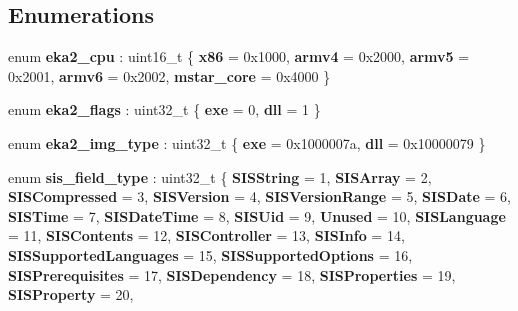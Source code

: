 \subsection*{Enumerations}
\begin{DoxyCompactItemize}
\item 
\mbox{\label{namespaceeka2l1_1_1loader_a2965b09ef67ddbbba27884b828b4d7de}} 
enum {\bfseries eka2\+\_\+cpu} \+: uint16\+\_\+t \{ \newline
{\bfseries x86} = 0x1000, 
{\bfseries armv4} = 0x2000, 
{\bfseries armv5} = 0x2001, 
{\bfseries armv6} = 0x2002, 
\newline
{\bfseries mstar\+\_\+core} = 0x4000
 \}
\item 
\mbox{\label{namespaceeka2l1_1_1loader_a7bbc600386d926fd237462ef426c4eff}} 
enum {\bfseries eka2\+\_\+flags} \+: uint32\+\_\+t \{ {\bfseries exe} = 0, 
{\bfseries dll} = 1
 \}
\item 
\mbox{\label{namespaceeka2l1_1_1loader_afeecb872ef5cc5f08b0a64828e4db532}} 
enum {\bfseries eka2\+\_\+img\+\_\+type} \+: uint32\+\_\+t \{ {\bfseries exe} = 0x1000007a, 
{\bfseries dll} = 0x10000079
 \}
\item 
\mbox{\label{namespaceeka2l1_1_1loader_a0810a682b50cd1c0f125ba1f1831d702}} 
enum {\bfseries sis\+\_\+field\+\_\+type} \+: uint32\+\_\+t \{ \newline
{\bfseries S\+I\+S\+String} = 1, 
{\bfseries S\+I\+S\+Array} = 2, 
{\bfseries S\+I\+S\+Compressed} = 3, 
{\bfseries S\+I\+S\+Version} = 4, 
\newline
{\bfseries S\+I\+S\+Version\+Range} = 5, 
{\bfseries S\+I\+S\+Date} = 6, 
{\bfseries S\+I\+S\+Time} = 7, 
{\bfseries S\+I\+S\+Date\+Time} = 8, 
\newline
{\bfseries S\+I\+S\+Uid} = 9, 
{\bfseries Unused} = 10, 
{\bfseries S\+I\+S\+Language} = 11, 
{\bfseries S\+I\+S\+Contents} = 12, 
\newline
{\bfseries S\+I\+S\+Controller} = 13, 
{\bfseries S\+I\+S\+Info} = 14, 
{\bfseries S\+I\+S\+Supported\+Languages} = 15, 
{\bfseries S\+I\+S\+Supported\+Options} = 16, 
\newline
{\bfseries S\+I\+S\+Prerequisites} = 17, 
{\bfseries S\+I\+S\+Dependency} = 18, 
{\bfseries S\+I\+S\+Properties} = 19, 
{\bfseries S\+I\+S\+Property} = 20, 

\end{DoxyCompactItemize}
